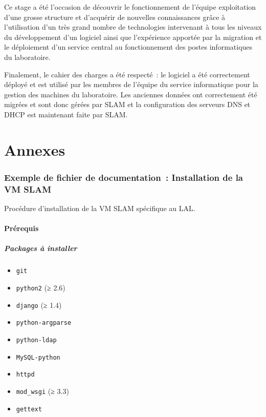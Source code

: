 \documentclass[12pt,a4paper,twoside]{report}
\begin{document}
Ce stage a été l’occasion de découvrir le fonctionnement de l’équipe
exploitation d’une grosse structure et d’acquérir de nouvelles connaissances
grâce à l’utilisation d’un très grand nombre de technologies intervenant à tous
les niveaux du développement d’un logiciel ainsi que l’expérience apportée par
la migration et le déploiement d’un service central au fonctionnement des
postes informatiques du laboratoire.

Finalement, le cahier des charges a été respecté~: le logiciel a été
correctement déployé et est utilisé par les membres de l’équipe du service
informatique pour la gestion des machines du laboratoire. Les anciennes
données ont correctement été migrées et sont donc gérées par SLAM et la
configuration des serveurs DNS et DHCP est maintenant faite par SLAM.

\appendix

\part*{Annexes}

\section*{Exemple de fichier de documentation~: Installation de la VM SLAM}

Procédure d’installation de la VM SLAM spécifique au LAL.

\subsection*{Prérequis}

\subsubsection{Packages à installer}

\begin{itemize}
	\item \verb+git+
	\item \verb+python2+ (≥ 2.6)
	\item \verb+django+ (≥ 1.4)
	\item \verb+python-argparse+
	\item \verb+python-ldap+
	\item \verb+MySQL-python+
	\item \verb+httpd+
	\item \verb+mod_wsgi+ (≥ 3.3)
	\item \verb+gettext+
\end{itemize}
~\\
\end{document}
